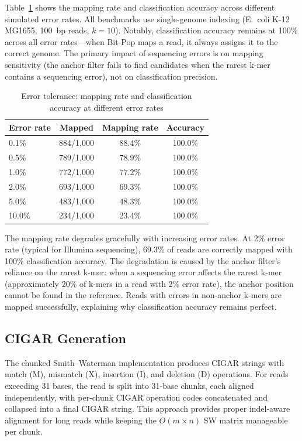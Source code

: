 \documentclass[10pt]{article}
\begin{document}
Table~\ref{tab:error} shows the mapping rate and classification accuracy across different simulated error rates. All benchmarks use single-genome indexing (E.~coli K-12 MG1655, 100~bp reads, $k=10$). Notably, classification accuracy remains at 100\% across all error rates---when Bit-Pop maps a read, it always assigns it to the correct genome. The primary impact of sequencing errors is on mapping sensitivity (the anchor filter fails to find candidates when the rarest k-mer contains a sequencing error), not on classification precision.

\begin{table}[htbp]
\centering
\caption{Error tolerance: mapping rate and classification accuracy at different error rates}
\label{tab:error}
\begin{tabular}{lccc}
\toprule
\textbf{Error rate} & \textbf{Mapped} & \textbf{Mapping rate} & \textbf{Accuracy} \\
\midrule
0.1\% & 884/1,000 & 88.4\% & 100.0\% \\
0.5\% & 789/1,000 & 78.9\% & 100.0\% \\
1.0\% & 772/1,000 & 77.2\% & 100.0\% \\
2.0\% & 693/1,000 & 69.3\% & 100.0\% \\
5.0\% & 483/1,000 & 48.3\% & 100.0\% \\
10.0\% & 234/1,000 & 23.4\% & 100.0\% \\
\bottomrule
\end{tabular}
\end{table}

The mapping rate degrades gracefully with increasing error rates. At 2\% error rate (typical for Illumina sequencing), 69.3\% of reads are correctly mapped with 100\% classification accuracy. The degradation is caused by the anchor filter's reliance on the rarest k-mer: when a sequencing error affects the rarest k-mer (approximately 20\% of k-mers in a read with 2\% error rate), the anchor position cannot be found in the reference. Reads with errors in non-anchor k-mers are mapped successfully, explaining why classification accuracy remains perfect.

\subsection{CIGAR Generation}

The chunked Smith--Waterman implementation produces CIGAR strings with match (M), mismatch (X), insertion (I), and deletion (D) operations. For reads exceeding 31 bases, the read is split into 31-base chunks, each aligned independently, with per-chunk CIGAR operation codes concatenated and collapsed into a final CIGAR string. This approach provides proper indel-aware alignment for long reads while keeping the $O(m \times n)$ SW matrix manageable per chunk.
\end{document}
